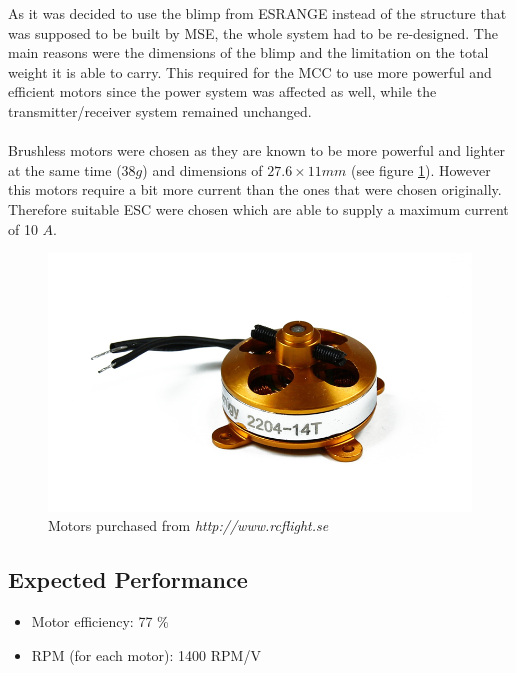 As it was decided to use the blimp from ESRANGE instead of the structure that was supposed to be built by MSE, the whole system had to be re-designed. The main reasons were the dimensions of the blimp and the limitation on the total weight it is able to carry. This required for the MCC to use more powerful and efficient motors since the power system was affected as well, while the transmitter/receiver system remained unchanged.
\\
\\
Brushless motors were chosen as they are known to be more powerful and lighter at the same time ($38 g$) and dimensions of $27.6 \times 11 mm$ (see figure \ref{fig:Motors}). However this motors require a bit more current than the ones that were chosen originally. Therefore suitable ESC were chosen which are able to supply a maximum current of 10 $A$.

\begin{figure}[bht]
\centering
\includegraphics[scale=0.35]{figures/Motors.jpg}
\caption{Motors purchased from \textit{http://www.rcflight.se}}
\label{fig:Motors}
\end{figure}

\subsection{Expected Performance}

\begin{itemize}
\item Motor efficiency: 77 \% 
\item RPM (for each motor): 1400 RPM/V
\end{itemize}

